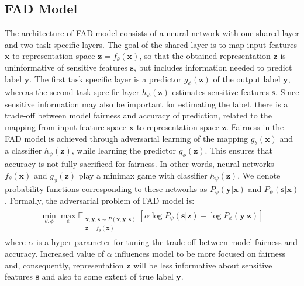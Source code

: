 \documentclass[preprint,12pt]{elsarticle}
\begin{document}
\subsection{FAD Model}

The architecture of FAD model consists of a neural network with one shared layer and two task specific layers.  The goal of the shared layer is to map input features $\mathbf{x}$ to representation space $\mathbf{z}=f_\theta(\mathbf{x})$, so that the obtained representation $\mathbf{z}$ is uninformative of sensitive features $\mathbf{s}$, but includes information needed to predict label $\mathbf{y}$. The first task specific layer is a predictor $g_\phi(\mathbf{z})$ of the output label $\mathbf{y}$, whereas the second task specific layer $h_\psi(\mathbf{z})$ estimates sensitive features $\mathbf{s}$. Since sensitive information may also be important for estimating the label, there is a trade-off between model fairness and accuracy of prediction, related to the mapping from input feature space $\mathbf{x}$ to representation space $\mathbf{z}$.
Fairness in the FAD model is achieved through adversarial learning of the mapping $g_\theta(\mathbf{x})$ and a classifier $h_\psi(\mathbf{z})$, while learning the predictor $g_\phi(\mathbf{z})$. This ensures that accuracy is not fully sacrificed for fairness. In other words, neural networks $f_\theta(\mathbf{x})$ and $g_\phi(\mathbf{z})$ play a minimax game with classifier $h_\psi(\mathbf{z})$. We denote probability functions corresponding to these networks as $P_\phi(\mathbf{y}|\mathbf{x})$ and $P_\psi(\mathbf{s}|\mathbf{x})$. Formally, the adversarial problem of FAD model is:
\begin{gather*}
\begin{split}
\min_{\theta,\phi}\max_{\psi} \mathbb{E}_{\substack{\mathbf{x},\mathbf{y},\mathbf{s} \sim P(\mathbf{x},\mathbf{y},\mathbf{s})\\\mathbf{z}=f_\theta(\mathbf{x})}} \left[\alpha\log P_{\psi}(\mathbf{s}|\mathbf{z}) - \log P_{\phi}(\mathbf{y}|\mathbf{z})\right]
\end{split}
\end{gather*}
where $\alpha$ is a hyper-parameter for tuning the trade-off between model fairness and accuracy. Increased value of $\alpha$ influences model to be more focused on fairness and, consequently, representation $\mathbf{z}$ will be less informative about sensitive features $\mathbf{s}$ and also to some extent of true label $\mathbf{y}$.
\end{document}
